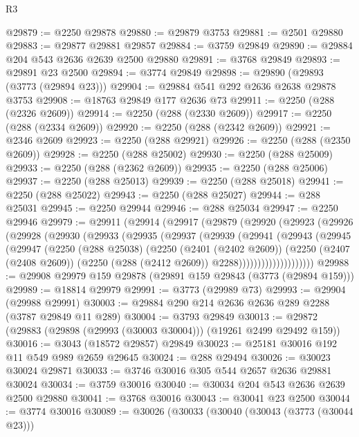 \begin{lexlean}{R3}
\begin{coremodule}
@29879 := @2250 @29878
@29880 := @29879 @3753
@29881 := @2501 @29880
@29883 := @29877 @29881 @29857
@29884 := @3759 @29849
@29890 := @29884 @204 @543 @2636 @2639 @2500 @29880
@29891 := @3768 @29849
@29893 := @29891 @23 @2500
@29894 := @3774 @29849
@29898 := @29890 (@29893 (@3773 (@29894 @23)))
@29904 := @29884 @541 @292 @2636 @2638 @29878 @3753
@29908 := @18763 @29849 @177 @2636 @73
@29911 := @2250 (@288 (@2326 @2609))
@29914 := @2250 (@288 (@2330 @2609))
@29917 := @2250 (@288 (@2334 @2609))
@29920 := @2250 (@288 (@2342 @2609))
@29921 := @2346 @2609
@29923 := @2250 (@288 @29921)
@29926 := @2250 (@288 (@2350 @2609))
@29928 := @2250 (@288 @25002)
@29930 := @2250 (@288 @25009)
@29933 := @2250 (@288 (@2362 @2609))
@29935 := @2250 (@288 @25006)
@29937 := @2250 (@288 @25013)
@29939 := @2250 (@288 @25018)
@29941 := @2250 (@288 @25022)
@29943 := @2250 (@288 @25027)
@29944 := @288 @25031
@29945 := @2250 @29944
@29946 := @288 @25034
@29947 := @2250 @29946
@29979 := @29911
    (@29914
      (@29917
        (@29879
          (@29920
            (@29923
              (@29926
                (@29928
                  (@29930
                    (@29933
                      (@29935
                        (@29937
                          (@29939
                            (@29941
                              (@29943
                                (@29945
                                  (@29947
                                    (@2250
                                      (@288 @25038)
                                      (@2250
                                        (@2401 (@2402 @2609))
                                        (@2250
                                          (@2407 (@2408 @2609))
                                          (@2250 (@288 (@2412 @2609)) @2288))))))))))))))))))))
@29988 := @29908 @29979 @159 @29878 (@29891 @159 @29843 (@3773 (@29894 @159)))
@29989 := @18814 @29979
@29991 := @3773 (@29989 @73)
@29993 := @29904 (@29988 @29991)
@30003 := @29884 @290 @214 @2636 @2636 @289 @2288 (@3787 @29849 @11 @289)
@30004 := @3793 @29849
@30013 := @29872 (@29883 (@29898 (@29993 (@30003 @30004))) (@19261 @2499 @29492 @159))
@30016 := @3043 (@18572 @29857) @29849
@30023 := @25181 @30016 @192 @11 @549 @989 @2659 @29645
@30024 := @288 @29494
@30026 := @30023 @30024 @29871
@30033 := @3746 @30016 @305 @544 @2657 @2636 @29881 @30024
@30034 := @3759 @30016
@30040 := @30034 @204 @543 @2636 @2639 @2500 @29880
@30041 := @3768 @30016
@30043 := @30041 @23 @2500
@30044 := @3774 @30016
@30089 := @30026
    (@30033
      (@30040
        (@30043 (@3773 (@30044 @23)))

\end{coremodule}
\end{lexlean}

